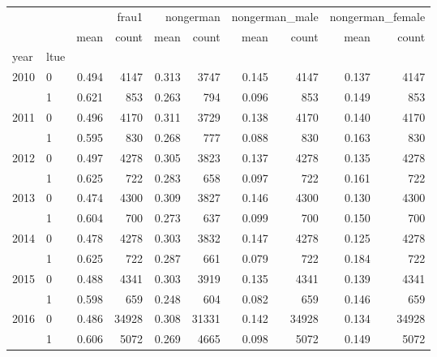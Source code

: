 \begin{tabular}{llrrrrrrrr}
\toprule
 &  & \multicolumn{2}{r}{frau1} & \multicolumn{2}{r}{nongerman} & \multicolumn{2}{r}{nongerman_male} & \multicolumn{2}{r}{nongerman_female} \\
 &  & mean & count & mean & count & mean & count & mean & count \\
year & ltue &  &  &  &  &  &  &  &  \\
\midrule
\multirow[t]{2}{*}{2010} & 0 & 0.494 & 4147 & 0.313 & 3747 & 0.145 & 4147 & 0.137 & 4147 \\
 & 1 & 0.621 & 853 & 0.263 & 794 & 0.096 & 853 & 0.149 & 853 \\
\cline{1-10}
\multirow[t]{2}{*}{2011} & 0 & 0.496 & 4170 & 0.311 & 3729 & 0.138 & 4170 & 0.140 & 4170 \\
 & 1 & 0.595 & 830 & 0.268 & 777 & 0.088 & 830 & 0.163 & 830 \\
\cline{1-10}
\multirow[t]{2}{*}{2012} & 0 & 0.497 & 4278 & 0.305 & 3823 & 0.137 & 4278 & 0.135 & 4278 \\
 & 1 & 0.625 & 722 & 0.283 & 658 & 0.097 & 722 & 0.161 & 722 \\
\cline{1-10}
\multirow[t]{2}{*}{2013} & 0 & 0.474 & 4300 & 0.309 & 3827 & 0.146 & 4300 & 0.130 & 4300 \\
 & 1 & 0.604 & 700 & 0.273 & 637 & 0.099 & 700 & 0.150 & 700 \\
\cline{1-10}
\multirow[t]{2}{*}{2014} & 0 & 0.478 & 4278 & 0.303 & 3832 & 0.147 & 4278 & 0.125 & 4278 \\
 & 1 & 0.625 & 722 & 0.287 & 661 & 0.079 & 722 & 0.184 & 722 \\
\cline{1-10}
\multirow[t]{2}{*}{2015} & 0 & 0.488 & 4341 & 0.303 & 3919 & 0.135 & 4341 & 0.139 & 4341 \\
 & 1 & 0.598 & 659 & 0.248 & 604 & 0.082 & 659 & 0.146 & 659 \\
\cline{1-10}
\multirow[t]{2}{*}{2016} & 0 & 0.486 & 34928 & 0.308 & 31331 & 0.142 & 34928 & 0.134 & 34928 \\
 & 1 & 0.606 & 5072 & 0.269 & 4665 & 0.098 & 5072 & 0.149 & 5072 \\
\cline{1-10}
\bottomrule
\end{tabular}
